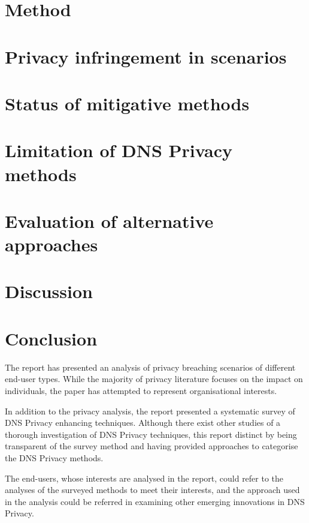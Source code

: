 \documentclass[a4paper,12pt]{article}
\begin{document}
\newpage
\section{Method}\label{Method}


\newpage
\section{Privacy infringement in scenarios}


\newpage
\section{Status of mitigative methods}\label{surveyresults}


\newpage
\section{Limitation of DNS Privacy methods}


\newpage
\section{Evaluation of alternative approaches}

\newpage

\section{Discussion}

\newpage

\section{Conclusion}
The report has presented an analysis of privacy breaching scenarios of different end-user types.
While the majority of privacy literature focuses on the impact on individuals, the paper has attempted to represent organisational interests.

In addition to the privacy analysis, the report presented a systematic survey of DNS Privacy enhancing techniques.
Although there exist other studies of a thorough investigation of DNS Privacy techniques, this report distinct by being transparent of the survey method and having provided approaches to categorise the DNS Privacy methods. 

The end-users, whose interests are analysed in the report, could refer to the analyses of the surveyed methods to meet their interests, and the approach used in the analysis could be referred in examining other emerging innovations in DNS Privacy. 
\end{document}
